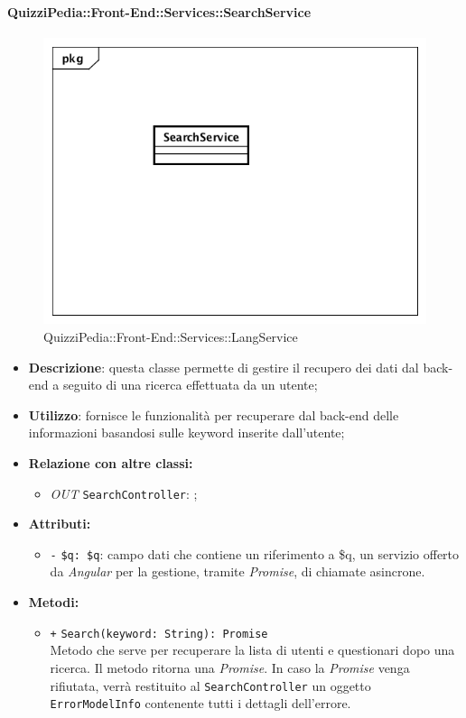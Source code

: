 \paragraph{QuizziPedia::Front-End::Services::SearchService}
\begin{figure}
	\centering
	\includegraphics[scale=0.45]{UML/Classi/Front-End/QuizziPedia_Front-end_Services_ SearchService.png}
	\caption{QuizziPedia::Front-End::Services::LangService}
\end{figure}
\begin{itemize}
	\item \textbf{Descrizione}: questa classe permette di gestire il recupero dei dati dal back-end a seguito di una ricerca effettuata da un utente;
	\item \textbf{Utilizzo}: fornisce le funzionalità per recuperare dal back-end delle informazioni basandosi sulle keyword inserite dall'utente;
	\item \textbf{Relazione con altre classi:}
	\begin{itemize}
		\item \textit{OUT} \texttt{SearchController}: ;
	\end{itemize}
	\item \textbf{Attributi:}
	\begin{itemize}
		\item \texttt{-} \texttt{\$q: \$q}: campo dati che contiene un riferimento a \$q, un servizio offerto da \textit{Angular} per la gestione, tramite \textit{Promise}, di chiamate asincrone. 
	\end{itemize}
	\item \textbf{Metodi:}
	\begin{itemize}
		\item \texttt{+} \texttt{Search(keyword: String): Promise} \\Metodo che serve per recuperare la lista di utenti e questionari dopo una ricerca. Il metodo ritorna una \textit{Promise}. In caso la \textit{Promise} venga rifiutata, verrà restituito al \texttt{SearchController} un oggetto \texttt{ErrorModelInfo} contenente tutti i dettagli dell'errore. \\
	\end{itemize}
\end{itemize}

